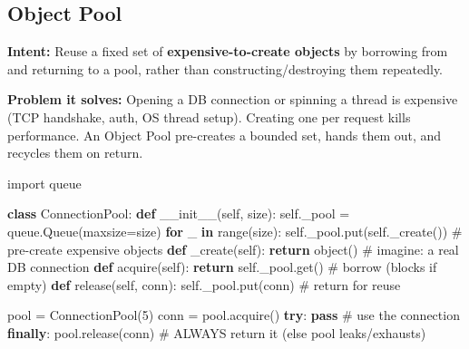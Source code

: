 \documentclass[11pt]{article}
\newenvironment{Shaded}{\begin{snugshade}}{\end{snugshade}}
\newcommand{\BuiltInTok}[1]{\textcolor[rgb]{0.50,0.55,0.55}{#1}}
\newcommand{\CommentTok}[1]{\textcolor[rgb]{0.48,0.49,0.49}{#1}}
\newcommand{\ControlFlowTok}[1]{\textcolor[rgb]{0.99,0.74,0.29}{\textbf{#1}}}
\newcommand{\DecValTok}[1]{\textcolor[rgb]{0.96,0.45,0.00}{#1}}
\newcommand{\FunctionTok}[1]{\textcolor[rgb]{0.56,0.27,0.68}{#1}}
\newcommand{\ImportTok}[1]{\textcolor[rgb]{0.15,0.68,0.38}{#1}}
\newcommand{\KeywordTok}[1]{\textcolor[rgb]{0.81,0.81,0.76}{\textbf{#1}}}
\newcommand{\NormalTok}[1]{\textcolor[rgb]{0.81,0.81,0.76}{#1}}
\newcommand{\OperatorTok}[1]{\textcolor[rgb]{0.81,0.81,0.76}{#1}}
\newcommand{\VariableTok}[1]{\textcolor[rgb]{0.15,0.68,0.68}{#1}}
\begin{document}
\subsection{Object Pool}\label{object-pool}

\textbf{Intent:} Reuse a fixed set of \textbf{expensive-to-create objects} by borrowing from and returning to a pool, rather than constructing/destroying them repeatedly.

\textbf{Problem it solves:} Opening a DB connection or spinning a thread is expensive (TCP handshake, auth, OS thread setup). Creating one per request kills performance. An Object Pool pre-creates a bounded set, hands them out, and recycles them on return.


\begin{Shaded}
\begin{Highlighting}[]
\ImportTok{import}\NormalTok{ queue}

\KeywordTok{class}\NormalTok{ ConnectionPool:}
    \KeywordTok{def} \FunctionTok{\_\_init\_\_}\NormalTok{(}\VariableTok{self}\NormalTok{, size):}
        \VariableTok{self}\NormalTok{.\_pool }\OperatorTok{=}\NormalTok{ queue.Queue(maxsize}\OperatorTok{=}\NormalTok{size)}
        \ControlFlowTok{for}\NormalTok{ \_ }\KeywordTok{in} \BuiltInTok{range}\NormalTok{(size):}
            \VariableTok{self}\NormalTok{.\_pool.put(}\VariableTok{self}\NormalTok{.\_create())      }\CommentTok{\# pre{-}create expensive objects}
    \KeywordTok{def}\NormalTok{ \_create(}\VariableTok{self}\NormalTok{): }\ControlFlowTok{return} \BuiltInTok{object}\NormalTok{()          }\CommentTok{\# imagine: a real DB connection}
    \KeywordTok{def}\NormalTok{ acquire(}\VariableTok{self}\NormalTok{): }\ControlFlowTok{return} \VariableTok{self}\NormalTok{.\_pool.get()  }\CommentTok{\# borrow (blocks if empty)}
    \KeywordTok{def}\NormalTok{ release(}\VariableTok{self}\NormalTok{, conn): }\VariableTok{self}\NormalTok{.\_pool.put(conn)  }\CommentTok{\# return for reuse}

\NormalTok{pool }\OperatorTok{=}\NormalTok{ ConnectionPool(}\DecValTok{5}\NormalTok{)}
\NormalTok{conn }\OperatorTok{=}\NormalTok{ pool.acquire()}
\ControlFlowTok{try}\NormalTok{:    }\ControlFlowTok{pass}                \CommentTok{\# use the connection}
\ControlFlowTok{finally}\NormalTok{: pool.release(conn) }\CommentTok{\# ALWAYS return it (else pool leaks/exhausts)}
\end{Highlighting}
\end{Shaded}
\end{document}
